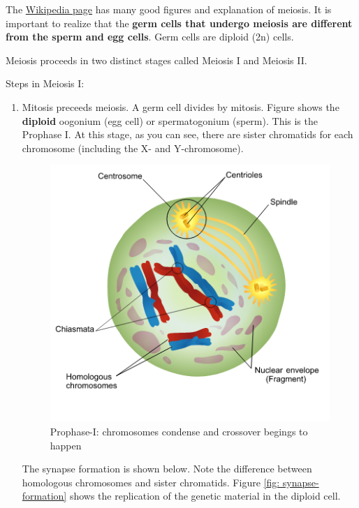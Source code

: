 \documentclass[12pt]{article}
\begin{document}
\newpage

The \href{https://upload.wikimedia.org/wikipedia/commons/7/74/Meiosis_Stages.svg}{Wikipedia page} has many good figures and explanation of meiosis. It is important to realize that the \textbf{germ cells that undergo meiosis are different from the sperm and egg cells}. Germ cells are diploid (2n) cells. 

Meiosis proceeds in two distinct stages called Meiosis I and Meiosis II.

Steps in Meiosis I:
\begin{enumerate}
    \item Mitosis preceeds meiosis. A germ cell divides by mitosis. Figure shows the \textbf{diploid} oogonium (egg cell) or spermatogonium (sperm). This is the Prophase I. At this stage, as you can see, there are sister chromatids for each chromosome (including the X- and Y-chromosome). 
\begin{figure}[h!]
    \centering
    \includegraphics[scale=0.4]{prophase-I.png}
    \caption{Prophase-I: chromosomes condense and crossover begings to happen}
    \label{fig: prophase-I}
\end{figure}
        The synapse formation is shown below. Note the difference between homologous chromosomes and sister chromatids. Figure \ref{fig: synapse-formation} shows the replication of the genetic material in the diploid cell. 
\begin{figure}[h!]
    \centering

\end{figure}
\end{enumerate}
\end{document}

